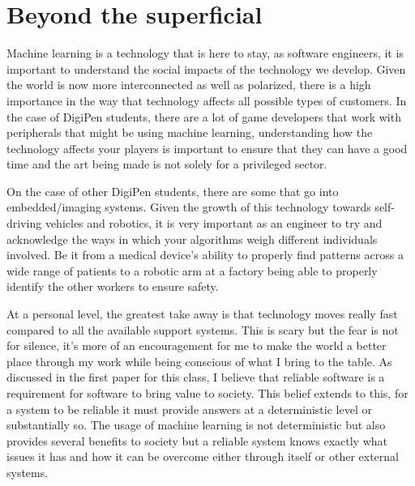 \section{Beyond the superficial}
Machine learning is a technology that is here to stay, as software engineers, it is important to understand the social impacts of the technology we develop. Given the world is now more interconnected as well as polarized, there is a high importance in the way that technology affects all possible types of customers. In the case of DigiPen students, there are a lot of game developers that work with peripherals that might be using machine learning, understanding how the technology affects your players is important to ensure that they can have a good time and the art being made is not solely for a privileged sector.

On the case of other DigiPen students, there are some that go into embedded/imaging systems. Given the growth of this technology towards self-driving vehicles and robotics, it is very important as an engineer to try and acknowledge the ways in which your algorithms weigh different individuals involved. Be it from a medical device's ability to properly find patterns across a wide range of patients to a robotic arm at a factory being able to properly identify the other workers to ensure safety.

At a personal level, the greatest take away is that technology moves really fast compared to all the available support systems. This is scary but the fear is not for silence, it's more of an encouragement for me to make the world a better place through my work while being conscious of what I bring to the table. As discussed in the first paper for this class, I believe that reliable software is a requirement for software to bring value to society. This belief extends to this, for a system to be reliable it must provide answers at a deterministic level or substantially so. The usage of machine learning is not deterministic but also provides several benefits to society but a reliable system knows exactly what issues it has and how it can be overcome either through itself or other external systems.
